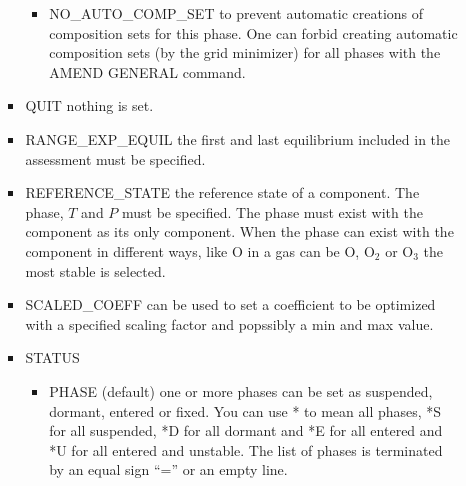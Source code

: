 \documentclass[12pt]{article}
\begin{document}
\begin{itemize}
\begin{itemize}
\begin{itemize}
\begin{itemize}
      \item NO\_AUTO\_COMP\_SET to prevent automatic creations of
        composition sets for this phase.  One can forbid creating
        automatic composition sets (by the grid minimizer) for all
        phases with the AMEND GENERAL command.
      \end{itemize}
  \item QUIT nothing is set.
  \item RANGE\_EXP\_EQUIL the first and last equilibrium included in
    the assessment must be specified.
  \item REFERENCE\_STATE the reference state of a component.  The phase,
    $T$ and $P$ must be specified.  The phase must exist with the
    component as its only component.  When the phase can exist with the
    component in different ways, like O in a gas can be O, O$_2$ or
    O$_3$ the most stable is selected.
  \item SCALED\_COEFF can be used to set a coefficient to be optimized
    with a specified scaling factor and popssibly a min and max value.
  \item STATUS          
    \begin{itemize}
    \item PHASE (default) one or more phases can be set as suspended,
      dormant, entered or fixed.  You can use * to mean all phases, *S
      for all suspended, *D for all dormant and *E for all entered and
      *U for all entered and unstable.  The list of phases is
      terminated by an equal sign ``='' or an empty line.


\end{itemize}
\end{itemize}
\end{itemize}
\end{itemize}
\end{document}
